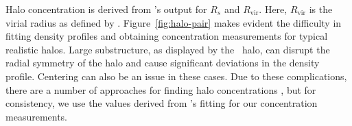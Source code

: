 Halo concentration is derived from \rockstar's output for $R_{s}$ and $R_{\mathrm{vir}}$.  Here, $R_{\mathrm{vir}}$ is the virial radius as defined by \citet{1998ApJ...495...80B}.  Figure~\ref{fig:halo-pair} makes evident the difficulty in fitting density profiles and obtaining concentration measurements for typical realistic halos.  Large substructure, as displayed by the \za\ halo, can disrupt the radial symmetry of the halo and cause significant deviations in the density profile.  Centering can also be an issue in these cases.  Due to these complications, there are a number of approaches for finding halo concentrations \citep{2012MNRAS.423.3018P}, but for consistency, we use the values derived from \rockstar's fitting for our concentration measurements.







